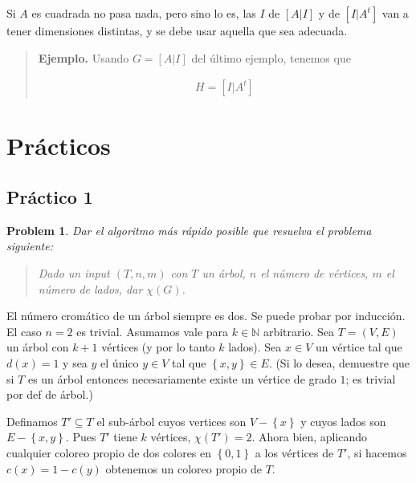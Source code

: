 \documentclass[a4paper]{article}
\newtheorem{problem}{Problem}
\newtheorem{problem}{Problem}
\begin{document}
Si $A$ es cuadrada no pasa nada, pero sino lo es, las $I$ de $[A|I]$ y de $[I |
A^t]$ van a tener dimensiones distintas, y se debe usar aquella que sea
adecuada.


\small
\begin{quote}

    \textbf{Ejemplo.} Usando $G = [A | I]$ del último ejemplo, tenemos que 

\begin{align*}
    H = [I | A^t]
\end{align*}

\end{quote}
\normalsize



\pagebreak


\section{Prácticos}

\subsection{Práctico 1}

\begin{problem}
    Dar el algoritmo más rápido posible que resuelva el problema siguiente: 

    \begin{quote}
        Dado un input $(T, n, m)$ con $T$ un árbol, $n$ el número de vértices,
        $m$ el número de lados, dar $\chi(G)$.
    \end{quote}
\end{problem}

El número cromático de un árbol siempre es dos. Se puede probar por inducción.
El caso $n = 2$ es trivial. Asumamos vale para $k \in \mathbb{N}$ arbitrario.
Sea $T = (V, E)$ un árbol con $k + 1$ vértices (y por lo tanto $k$ lados).
Sea $x \in V$ un vértice tal que $d(x) = 1$ y sea $y$ el único $y \in V$ tal que
$\left\{ x, y \right\} \in E $. (Si lo desea, demuestre que si $T$
es un árbol entonces necesariamente existe un vértice de grado $1$; es trivial
por def de árbol.) 

Definamos $T' \subseteq T$ el sub-árbol cuyos vertices son $V - \left\{ x
\right\} $ y cuyos lados son $E - \left\{ x, y \right\} $. Pues $T'$ tiene $k$
vértices, $\chi(T') = 2$. Ahora bien, aplicando cualquier coloreo propio de dos
colores en $\left\{ 0, 1 \right\} $ a los vértices de $T'$, si hacemos $c(x) = 1
- c(y)$ obtenemos un coloreo propio de $T$. 
\end{document}
